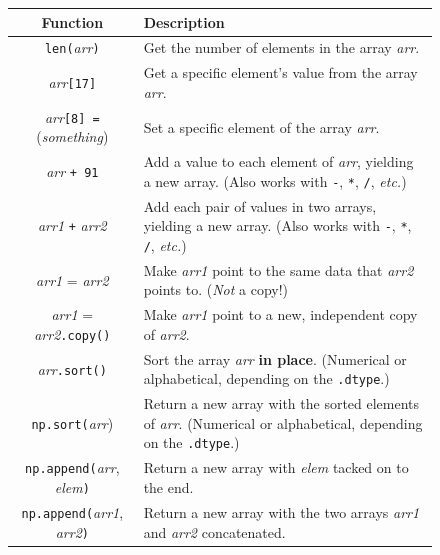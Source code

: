 \begin{figure}[ht]
\centering
\footnotesize
\begin{tabular}{c|p{3.1in}}
Function & Description \\
\hline

\texttt{len(}\textsl{arr}\texttt{)} & Get the number of elements in the array \textsl{arr}. \\

\textsl{arr}\texttt{[17]} & Get a specific element's value from the array \textsl{arr}. \\

\textsl{arr}\texttt{[8] =} (\textsl{something}) & Set a specific element of the array \textsl{arr}. \\

\textsl{arr} \texttt{+ 91} & Add a value to each element of \textsl{arr},
yielding a new array. (Also works with \texttt{-}, \texttt{*}, \texttt{/},
\textit{etc.}) \\

\textsl{arr1} \texttt{+} \textsl{arr2} & Add each pair of values in two arrays,
yielding a new array. (Also works with \texttt{-}, \texttt{*}, \texttt{/},
\textit{etc.}) \\

\textsl{arr1} = \textsl{arr2} & Make \textsl{arr1} point to the same data that
\textsl{arr2} points to. (\textit{Not} a copy!)\\

\textsl{arr1} = \textsl{arr2}\texttt{.copy()} & Make \textsl{arr1} point to a
new, independent copy of \textsl{arr2}. \\

\textsl{arr}\texttt{.sort()} & Sort the array \textsl{arr} \textbf{in place}. (Numerical or
alphabetical, depending on the \texttt{.dtype}.) \\

\texttt{np.sort(}\textsl{arr}) & Return a new array with the sorted elements
of \textsl{arr}. (Numerical or alphabetical, depending on the \texttt{.dtype}.)
\\

\texttt{np.append(}\textsl{arr}, \textsl{elem}\texttt{)} &
    Return a new array with \textsl{elem} tacked on to the end. \\

\texttt{np.append(}\textsl{arr1}, \textsl{arr2}\texttt{)} &
    Return a new array with the two arrays \textsl{arr1} and \textsl{arr2} concatenated. \\


\end{tabular}
\end{figure}
